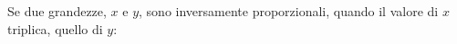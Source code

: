 Se due grandezze, $x$ e $y$, sono inversamente proporzionali, 
quando il valore di $x$ triplica, quello di $y$:
